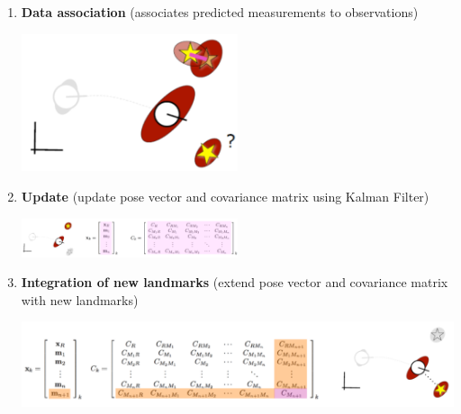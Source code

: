\documentclass[10pt]{article}
\begin{document}
\begin{enumerate}
    \item \textbf{Data association} (associates predicted measurements to observations)
    \begin{center} 
        \includegraphics*[width=0.5\textwidth]{L2_15.png} 
    \end{center}
    \item \textbf{Update} (update pose vector and covariance matrix using Kalman Filter)
    \begin{center} 
        \includegraphics*[width=0.5\textwidth]{L2_16.png} 
    \end{center}
    \item \textbf{Integration of new landmarks} (extend pose vector and covariance matrix with new landmarks)
    \begin{center} 
        \includegraphics*[width=\textwidth]{L2_17.png} 
    \end{center}
\end{enumerate} 
\end{document}
